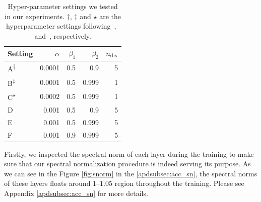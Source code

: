 \documentclass{article}
\makeatletter
\newcommand{\tblcaption}[1]{\def\@captype{table}\caption{#1}}
\makeatother
\begin{document}
\begin{table}[t]
  \tblcaption{\label{tab:settings}
  Hyper-parameter settings we tested in our experiments. $\dagger$, $\ddagger$ and $\star$ are the hyperparameter settings following~\cite{gulrajani2017improved},~\cite{warde2016improving} and~\cite{radford2015unsupervised}, respectively.}
  \centering
  \small{
  \begin{tabular}{lrrrr}
    \toprule
    \textbf{Setting} & $\alpha$ & $\beta_1$ & $\beta_2$ & $n_{\rm dis}$\\
    \midrule
    A\textsuperscript{$\dagger$}& 0.0001 & 0.5 & 0.9 & 5\\
    B\textsuperscript{$\ddagger$}& 0.0001 & 0.5 & 0.999 & 1\\
    C\textsuperscript{$\star$}& 0.0002 & 0.5 & 0.999 & 1\\
    D & 0.001 & 0.5 & 0.9 & 5\\
    E & 0.001 & 0.5 & 0.999 & 5\\
    F & 0.001 & 0.9 & 0.999 & 5\\
  \bottomrule
  \end{tabular}
  }
\end{table}
Firstly, we inspected the spectral norm of each layer during the training to make sure that our spectral normalization procedure is indeed serving its purpose.
As we can see in the Figure \ref{fig:snorm} in the \ref{apdsubsec:acc_sn}, the spectral norms of these layers floats around $1$--$1.05$ region throughout the training.
Please see Appendix \ref{apdsubsec:acc_sn} for more details.
\end{document}
